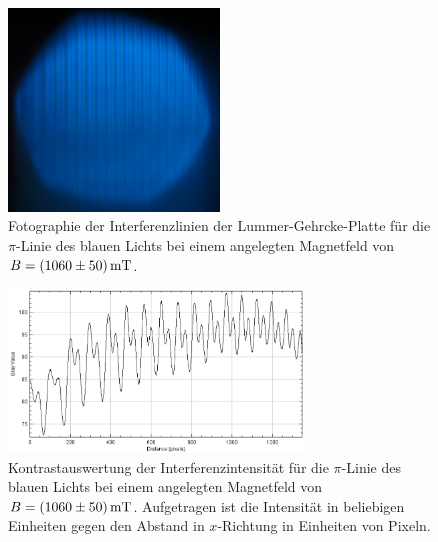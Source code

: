 \begin{figure}
  \centering
  \includegraphics[width=0.5\textwidth]{bilder/3009_BLAU_1100mT_pi.jpg}
  \caption{Fotographie der Interferenzlinien der Lummer-Gehrcke-Platte für die $\pi$-Linie des blauen Lichts bei einem angelegten Magnetfeld von $B=\SI{1060 \pm 50}{\milli\tesla}$.}
  \label{abb:piblau1060mT}
\end{figure}
\begin{figure}
  \centering
  \includegraphics[width=0.7\textwidth]{bilder/pi_BLAU_1100mT.PNG}
  \caption{Kontrastauswertung der Interferenzintensität für die $\pi$-Linie des blauen Lichts bei einem angelegten Magnetfeld von $B=\SI{1060 \pm 50}{\milli\tesla}$. Aufgetragen ist die Intensität in beliebigen Einheiten gegen den Abstand in $x$-Richtung in Einheiten von Pixeln.}
  \label{abb:plotpiblau1060mT}
\end{figure}
